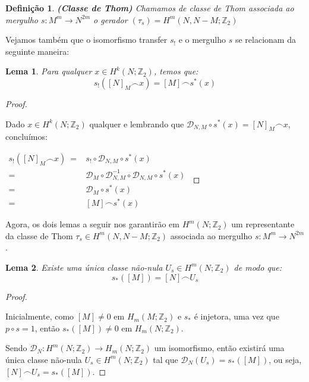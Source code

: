 \documentclass[12pt,oneside]{book} %
\newtheorem{defi}   {\hspace{0.5cm}Defini\c c\~ao}[chapter]
\newtheorem{lem}    {\hspace{0.5cm}Lema}[chapter]
\newcommand{\Z}{\mathbb{Z}}
\newcommand{\ccap}{\frown}
\begin{document}
\begin{defi}{\bf (Classe de Thom)}
	Chamamos de classe de Thom associada ao mergulho $s:M^{m}\to N^{2m}$ o gerador $(\tau_{s})=H^{m}(N,N-M;\Z_{2})$
\end{defi}

\par Vejamos também que o isomorfismo transfer $s_{!}$ e o mergulho $s$ se relacionam da seguinte maneira:

\begin{lem}\label{lema_tecnico_dualidades_4}
	Para qualquer $x\in H^{k}(N;\Z_{2})$, temos que:
	$$ s_{!}([N]_{M}\ccap x)=[M]\ccap s^{*}(x) $$
\end{lem}
\begin{proof}
	
	\
	
	\par Dado $x\in H^{k}(N;\Z_{2})$ qualquer e lembrando que $\mathcal{D}_{N,M}\circ s^{*}(x)=[N]_{M}\ccap x$, concluímos: \newline
	
	$ \begin{array}{rl}
		s_{!}([N]_{M}\ccap x) \ = & s_{!}\circ \mathcal{D}_{N,M}\circ s^{*}(x) \\
		= & \mathcal{D}_{M}\circ \mathcal{D}_{N,M}^{-1}\circ \mathcal{D}_{N,M}\circ s^{*}(x) \\
		= & \mathcal{D}_{M}\circ s^{*}(x) \\
		= & [M]\ccap s^{*}(x)
	\end{array} $
	
\end{proof}

\par Agora, os dois lemas a seguir nos garantirão em $H^{m}(N;\Z_{2})$ um representante da classe de Thom $\tau_{s}\in H^{m}(N,N-M;\Z_{2})$ associada ao mergulho $s:M^{m}\to N^{2m}$.

\begin{lem}\label{lema_tecnico_dualidades_3}
	Existe uma única classe não-nula $U_{s}\in H^{m}(N;\Z_{2})$ de modo que:
	$$ s_{*}([M])=[N]\ccap U_{s} $$
\end{lem}
\begin{proof}
	
	\
	
	\par Inicialmente, como $[M]\neq 0$ em $H_{m}(M;\Z_{2})$ e $s_{*}$ é injetora, uma vez que $p\circ s=1$, então $s_{*}([M])\neq 0$ em $H_{m}(N;\Z_{2})$.
	
	\par Sendo $\mathcal{D}_{N}:H^{m}(N;\Z_{2})\to H_{m}(N;\Z_{2})$ um isomorfismo, então existirá uma única classe não-nula $U_{s}\in H^{m}(N;\Z_{2})$ tal que $\mathcal{D}_{N}(U_{s})=s_{*}([M])$, ou seja, $[N]\ccap U_{s}=s_{*}([M])$.
	
\end{proof}
\end{document}
